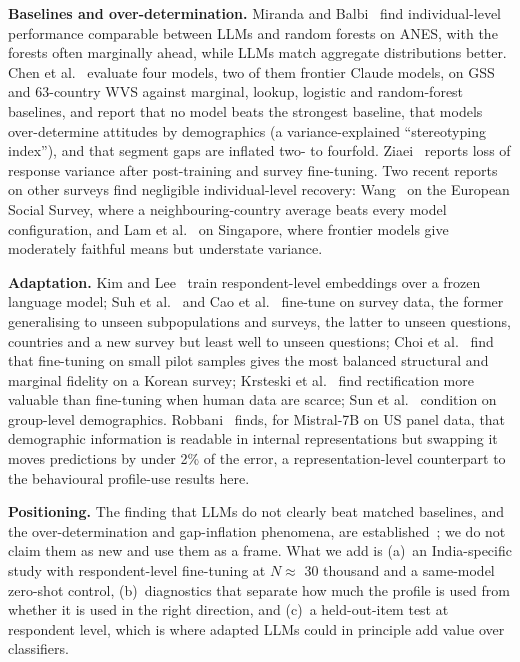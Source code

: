 \documentclass[conference]{IEEEtran}
\begin{document}
\textbf{Baselines and over-determination.} Miranda and Balbi~\cite{miranda2025} find individual-level performance comparable between LLMs and random forests on ANES, with the forests often marginally ahead, while LLMs match aggregate distributions better. Chen et al.~\cite{chen2026} evaluate four models, two of them frontier Claude models, on GSS and 63-country WVS against marginal, lookup, logistic and random-forest baselines, and report that no model beats the strongest baseline, that models over-determine attitudes by demographics (a variance-explained ``stereotyping index''), and that segment gaps are inflated two- to fourfold. Ziaei~\cite{ziaei2026} reports loss of response variance after post-training and survey fine-tuning. Two recent reports on other surveys find negligible individual-level recovery: Wang~\cite{wang2026} on the European Social Survey, where a neighbouring-country average beats every model configuration, and Lam et al.~\cite{lam2026} on Singapore, where frontier models give moderately faithful means but understate variance.

\textbf{Adaptation.} Kim and Lee~\cite{kim2023} train respondent-level embeddings over a frozen language model; Suh et al.~\cite{suh2025} and Cao et al.~\cite{cao2025} fine-tune on survey data, the former generalising to unseen subpopulations and surveys, the latter to unseen questions, countries and a new survey but least well to unseen questions; Choi et al.~\cite{choi2026} find that fine-tuning on small pilot samples gives the most balanced structural and marginal fidelity on a Korean survey; Krsteski et al.~\cite{krsteski2025} find rectification more valuable than fine-tuning when human data are scarce; Sun et al.~\cite{sun2024} condition on group-level demographics. Robbani~\cite{robbani2026} finds, for Mistral-7B on US panel data, that demographic information is readable in internal representations but swapping it moves predictions by under 2\% of the error, a representation-level counterpart to the behavioural profile-use results here.

\textbf{Positioning.} The finding that LLMs do not clearly beat matched baselines, and the over-determination and gap-inflation phenomena, are established~\cite{chen2026,miranda2025,hu2024}; we do not claim them as new and use them as a frame. What we add is (a)~an India-specific study with respondent-level fine-tuning at $N\approx$ 30 thousand and a same-model zero-shot control, (b)~diagnostics that separate how much the profile is used from whether it is used in the right direction, and (c)~a held-out-item test at respondent level, which is where adapted LLMs could in principle add value over classifiers.
\end{document}
